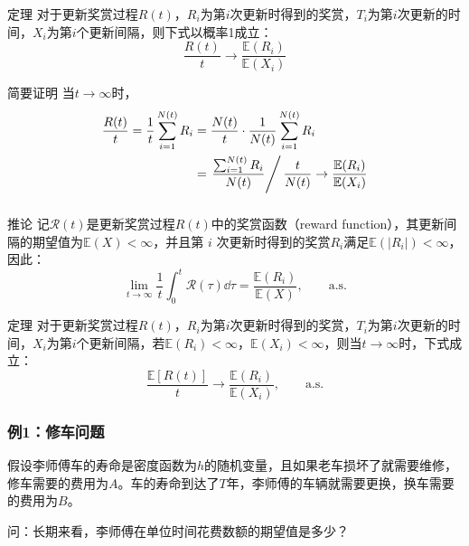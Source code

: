 \documentclass[t]{beamer}
\newcommand{\E}{\mathbb{E}}
\begin{document}
\begin{frame}
  \frametitle{}
\begin{block}{定理}
  对于更新奖赏过程$R(t)$，$R_i$为第$i$次更新时得到的奖赏，$T_i$为第$i$次更新的时间，$X_i$为第$i$个更新间隔，则下式以概率1成立：
\begin{equation*}
    \frac{R(t)}{t}\to\frac{\E(R_i)}{\E(X_i)}
\end{equation*}
\end{block}
  
\begin{block}{简要证明}
  当$t\to\infty$时，
    \[\begin{split}
        \frac{R(t)}{t}=\frac{1}{t}\sum^{N(t)}_{i=1}R_i 
        &=\frac{N(t)}{t}\cdot \frac{1}{N(t)}\sum^{N(t)}_{i=1}R_i \\
        &=\left.\frac{\sum^{N(t)}_{i=1}R_i}{N(t)}\right/\frac{t}{N(t)} \to \frac{\E(R_i)}{\E(X_i)}
    \end{split}\]
\end{block}
\end{frame}


\begin{frame}
  \frametitle{}
\begin{block}{推论}
记$\mathcal{R}(t)$是更新奖赏过程$R(t)$中的奖赏函数（reward function），其更新间隔的期望值为$\E(X)<\infty$，并且第 $i$ 次更新时得到的奖赏$R_i$满足$\E(|R_i|)<\infty$，因此：
\begin{equation*}
    \lim_{t\to\infty}\frac{1}{t}\int^t_0 \mathcal{R}(\tau)\dd \tau=\frac{\E(R_i)}{\E(X)},\qquad \text{a.s.}
\end{equation*}
\end{block}



\begin{block}{定理}
    对于更新奖赏过程$R(t)$，$R_i$为第$i$次更新时得到的奖赏，$T_i$为第$i$次更新的时间，$X_i$为第$i$个更新间隔，若$\E(R_i)<\infty$，$\E(X_i)<\infty$，则当$t\to\infty$时，下式成立：
    \begin{equation*}
        \frac{\E[R(t)]}{t}\to\frac{\E(R_i)}{\E(X_i)},\qquad \text{a.s.}
    \end{equation*}
    \end{block}
\end{frame}


\begin{frame}
  \frametitle{例1：修车问题}  
假设李师傅车的寿命是密度函数为$h$的随机变量，且如果老车损坏了就需要维修，修车需要的费用为$A$。车的寿命到达了$T$年，李师傅的车辆就需要更换，换车需要的费用为$B$。
    
  问：长期来看，李师傅在单位时间花费数额的期望值是多少？

\end{frame}
\end{document}
